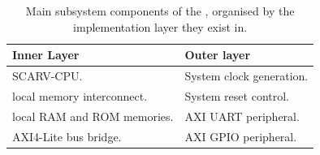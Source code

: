 \begin{table}[H]
\centering
\begin{tabular}{ll}
{\bf Inner Layer}           & {\bf Outer layer} \\ \hline
SCARV-CPU.                  & System clock generation. \\
local memory interconnect.  & System reset control. \\
local RAM and ROM memories. & AXI UART peripheral. \\
AXI4-Lite bus bridge.       & AXI GPIO peripheral.
\end{tabular}
\caption{Main subsystem components of the \SCARVSOC, organised by
the implementation layer they exist in.}
\label{tab:design:overview:component-layers}
\end{table}

